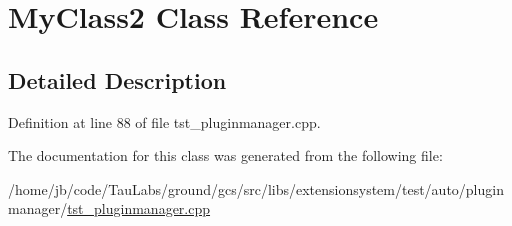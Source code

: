 \hypertarget{class_my_class2}{\section{\-My\-Class2 \-Class \-Reference}
\label{class_my_class2}
}


\subsection{\-Detailed \-Description}


\-Definition at line 88 of file tst\-\_\-pluginmanager.\-cpp.



\-The documentation for this class was generated from the following file\-:\begin{DoxyCompactItemize}
\item 
/home/jb/code/\-Tau\-Labs/ground/gcs/src/libs/extensionsystem/test/auto/pluginmanager/\hyperlink{tst__pluginmanager_8cpp}{tst\-\_\-pluginmanager.\-cpp}\end{DoxyCompactItemize}
